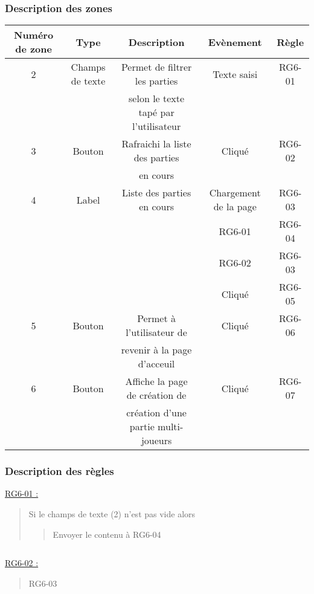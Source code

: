\documentclass{report}
\begin{document}
		\subsubsection{Description des zones}

			\begin{tabular}{|c|c|c|c|c|} \hline
				Numéro de zone & Type  & Description & Evènement &	Règle \\\hline
				2 & Champs de texte & Permet de filtrer les parties & Texte saisi & RG6-01 \\
				  &                 & selon le texte tapé par l'utilisateur & & \\\hline
				3 & Bouton & Rafraichi la liste des parties & Cliqué & RG6-02 \\
				  &        & en cours & & \\\hline
				4 & Label & Liste des parties en cours & Chargement de la page & RG6-03 \\
				  &       &                            & RG6-01 & RG6-04 \\
				  &       &                            & RG6-02 & RG6-03 \\
				  &       &                            & Cliqué & RG6-05 \\\hline
				5 & Bouton & Permet à l'utilisateur de & Cliqué & RG6-06 \\
				  &        & revenir à la page d'acceuil & & \\\hline
				6 & Bouton & Affiche la page de création de & Cliqué & RG6-07 \\
				  &        & création d'une partie multi-joueurs & & \\\hline    
			\end{tabular}

		\subsubsection{Description des règles}

			\underline{RG6-01 :}
				\begin{quote}
					Si le champs de texte (2) n'est pas vide alors
					\begin{quote}	
						Envoyer le contenu à RG6-04
					\end{quote}					
				\end{quote}	
		
			$\,$
				
			\underline{RG6-02 :}
				\begin{quote}	
					RG6-03
				\end{quote}
\end{document}
